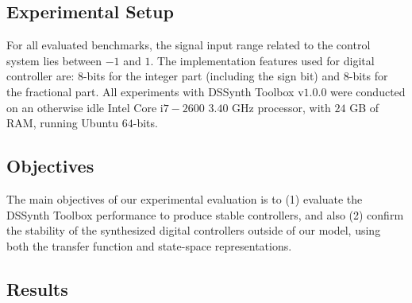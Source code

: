 \documentclass[10pt,conference]{IEEEtran}
\newcommand\tool{{DSSynth Toolbox}\xspace}
\begin{document}

\subsection{Experimental Setup}
\label{experimental-setup}

For all evaluated benchmarks, the signal input range related to the control system 
lies between $-1$ and $1$. The implementation features used for digital controller are:
$8$-bits for the integer part (including the sign bit) and $8$-bits for the fractional 
part. All experiments with \tool v$1$.$0$.$0$  were conducted on an otherwise idle 
Intel Core i$7-2600$ $3.40$ GHz processor, with $24$ GB of RAM, running Ubuntu $64$-bits.

\subsection{Objectives}

The main objectives of our experimental evaluation is to (1) evaluate the \tool performance 
to produce stable controllers, and also (2) confirm the stability of the synthesized digital 
controllers outside of our model, using both the transfer function and state-space representations.

\subsection{Results}


\end{document}
